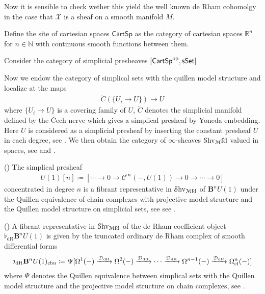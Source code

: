 \documentclass[10pt]{amsart}
\begin{document}
Now it is sensible to check wether this yield the well known de Rham
cohomolgy in the case that $\mathcal{X}$ is a sheaf on a smooth
manifold $M$.

\begin{definition}
  Define the site of cartesian spaces $\mathsf{CartSp}$ as the category of cartesian
  spaces $\mathbb{R}^n$ for $n\in \mathbb{N}$ with continuous smooth
  functions between them.

  Consider the category of simplicial presheaves
  $[\mathsf{CartSp}^{\mathrm{op}}, \mathsf{sSet}]$


  Now we endow the category of simplical sets with the quillen model
  structure and localize at the maps
  \begin{align*}
    \check{C}(\{U_i\rightarrow U\}) \rightarrow U
  \end{align*}
  where $\{U_i \rightarrow U\}$ is a covering family of $U$, $\check{C}$
  denotes the simplicial manifold defined by the \v{C}ech nerve which
  gives a simplical presheaf by Yoneda embedding. Here $U$ is
  considered as a simplicial presheaf by inserting the constant
  presheaf $U$ in each degree, see \cite[Section
  2]{dugger2001universal}. We then obtain the category of
  $\infty$-sheaves $\mathcal{S}\mathrm{hv}_{\mathcal{M}}\mathrm{fd}$ valued in spaces, see
  \cite[Prop. 6.5.2.14.]{lurie2009htt} and \cite[Thm. 2.2.15.]{schreiber2013cohesive}.
\end{definition}

\begin{proposition}
  (\cite[Prop. 4.4.22., Def. 4.4.21.]{schreiber2013cohesive})
  The simplical presheaf
  \begin{align*}
    U(1)[n] \coloneqq
    [
    \cdots \rightarrow 0 \rightarrow \mathcal{C}^\infty (-, U(1))
    \rightarrow 0\rightarrow \cdots \rightarrow 0
    ]
  \end{align*}
  concentrated in degree $n$ is a fibrant representative in
  $\mathcal{S}\mathrm{hv}_{\mathcal{M}\mathrm{fd}}$ of $\mathbf{B}^nU(1)$ under the Quillen equivalence of
  chain complexes with projective model structure and the Quillen
  model structure on simplicial sets, see see \cite[Prop. 2.2.31.]{schreiber2013cohesive}.
\end{proposition}

\begin{proposition}
  (\cite[Prop. 4.4.49.]{schreiber2013cohesive})
  A fibrant representative in $\mathcal{S}\mathrm{hv}_{\mathcal{M}\mathrm{fd}}$ of the de Rham coefficient
  object $\flat_{\mathrm{dR}}\mathbf{B}^nU(1)$ is given by the
  truncated ordinary de Rham complex of smooth differential forms
  \begin{align*}
    \flat_{\mathrm{dR}}\mathbf{B}^nU(1)_{\mathrm{chn}} \coloneqq
    \Psi
    [
    \Omega^1(-) \xrightarrow{\mathcal{D}_{\mathrm{dR}}}
    \Omega^2(-) \xrightarrow{\mathcal{D}_{\mathrm{dR}}}
    \cdots
    \xrightarrow{\mathcal{D}_{\mathrm{dR}}}
    \Omega^{n-1}(-) \xrightarrow{\mathcal{D}_{\mathrm{dR}}}
    \Omega^n_{\mathrm{cl}}(-)
    ]
  \end{align*}
  where $\Psi$ denotes the Quillen equivalence between simplical sets
  with the Quillen model structure and the projective model structure
  on chain complexes, see \cite[Prop. 2.2.31.]{schreiber2013cohesive}.
\end{proposition}
\end{document}
